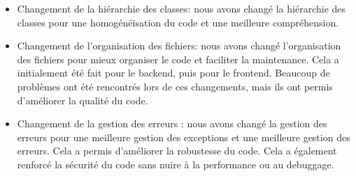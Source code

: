 \begin{itemize}
    \item Changement de la hiérarchie des classes: nous avons changé la hiérarchie des classes pour
    une homogénéisation du code et une meilleure compréhension.
    \item Changement de l'organisation des fichiers: nous avons changé l'organisation des fichiers pour
    mieux organiser le code et faciliter la maintenance. Cela a initialement été fait pour le backend, puis
    pour le frontend. Beaucoup de problèmes ont été rencontrés lors de ces changements, mais ils ont permis
    d'améliorer la qualité du code.
    \item Changement de la gestion des erreurs : nous avons changé la gestion des erreurs pour une meilleure
    gestion des exceptions et une meilleure gestion des erreurs. Cela a permis d'améliorer la robustesse du code.
    Cela a également renforcé la sécurité du code sans nuire à la performance ou au debuggage.
\end{itemize}

